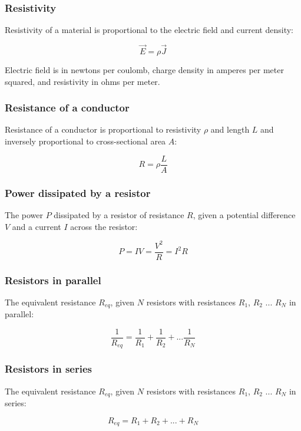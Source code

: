 \documentclass[12pt]{article}
\begin{document}
\subsubsection{Resistivity}

Resistivity of a material is proportional to the electric field and current density:

\[
\boxed{
\vec{E} = \rho \vec{J}
}
\]

Electric field is in newtons per coulomb, charge density in amperes per meter squared, and resistivity in ohms per meter.

\subsubsection{Resistance of a conductor}

Resistance of a conductor is proportional to resistivity $\rho$ and length $L$ and inversely proportional to cross-sectional area $A$:

\[
\boxed{
R = \rho \frac{L}{A}
}
\]

\subsubsection{Power dissipated by a resistor}

The power $P$ dissipated by a resistor of resistance $R$, given a potential difference $V$ and a current $I$ across the resistor:

\[
\boxed{
P = IV = \frac{V^2}{R} = I^2 R
}
\]

\subsubsection{Resistors in parallel}

The equivalent resistance $R_{eq}$, given $N$ resistors with resistances $R_1$, $R_2$ ... $R_N$ in parallel:

\[
\boxed{
\frac{1}{R_{eq}} = \frac{1}{R_1} + \frac{1}{R_2} + ... \frac{1}{R_N}
}
\]

\newpage

\subsubsection{Resistors in series}

The equivalent resistance $R_{eq}$, given $N$ resistors with resistances $R_1$, $R_2$ ... $R_N$ in series:

\[
\boxed{
R_{eq} = R_1 + R_2 + ... + R_N
}
\]
\end{document}
